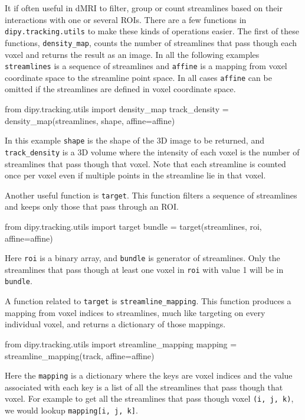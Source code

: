 \documentclass{bioinfo}
\begin{document}
It if often useful in dMRI to filter, group or count streamlines based on their
interactions with one or several ROIs. There are a few functions in
\texttt{dipy.tracking.utils} to make these kinds of operations easier. The
first of these functions, \texttt{density\_map}, counts the number of
streamlines that pass though each voxel and returns the result as an image. In
all the following examples \texttt{streamlines} is a sequence of streamlines and
\texttt{affine} is a mapping from voxel coordinate space to the streamline
point space. In all cases \texttt{affine} can be omitted if the streamlines
are defined in voxel coordinate space.
\begin{python}
from dipy.tracking.utils import density_map
track_density = density_map(streamlines, shape,
                            affine=affine)
\end{python}
In this example \texttt{shape} is the shape of the 3D image to be returned, and
\texttt{track\_density} is a 3D volume where the intensity of each voxel is the
number of streamlines that pass though that voxel. Note that
each streamline is counted once per voxel even if multiple points in the
streamline lie in that voxel.

Another useful function is \texttt{target}. This function filters a sequence of
streamlines and keeps only those that pass through an ROI.
\begin{python}
from dipy.tracking.utils import target
bundle = target(streamlines, roi, affine=affine)
\end{python}
Here \texttt{roi} is a binary array, and \texttt{bundle} is generator of
streamlines.  Only the streamlines that pass though at least
one voxel in \texttt{roi} with value 1 will be in \texttt{bundle}.

A function related to \texttt{target} is \texttt{streamline\_mapping}. This
function produces a mapping from voxel indices to streamlines, much like targeting
on every individual voxel, and returns a dictionary of those mappings.
\begin{python}
from dipy.tracking.utils import streamline_mapping
mapping = streamline_mapping(track, affine=affine)
\end{python}
Here the \texttt{mapping} is a dictionary where the keys are voxel indices and
the value associated with each key is a list of all the streamlines that pass though that voxel. For example to get all the
streamlines that pass though voxel \texttt{(i, j, k)}, we would lookup
\texttt{mapping[i, j, k]}.
\end{document}
